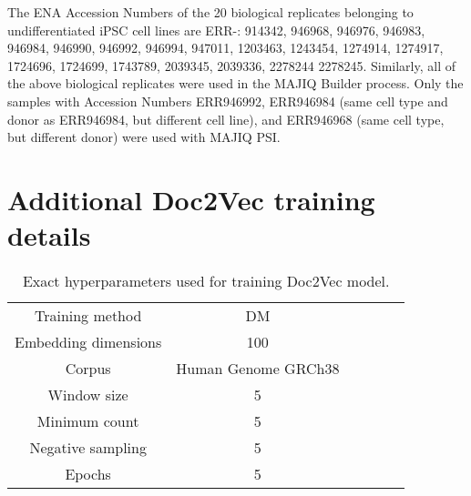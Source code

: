 The ENA Accession Numbers of the 20 biological replicates belonging to undifferentiated iPSC cell lines \cite{hipsci} are ERR-: 
914342, 946968, 946976, 946983, 946984, 946990, 946992, 946994, 947011, 1203463, 1243454, 1274914, 1274917, 1724696, 1724699, 1743789, 2039345, 2039336, 2278244 2278245.
Similarly, all of the above biological replicates were used in the MAJIQ Builder process. Only the samples with Accession Numbers ERR946992, ERR946984 (same cell type and donor as ERR946984, but different cell line), and ERR946968 (same cell type, but different donor) were used with MAJIQ PSI. 
%
%
%
%
%
%
%
%

%
%
%
%
%
%
%
%
%

\section{Additional Doc2Vec training details} \label{app:d2v}

\begin{table}[h!]
	\centering
	\begin{tabular}{ c c c  c c c} 
		\hline
		Training method & DM \\
		Embedding dimensions & 100 \\
		Corpus & Human Genome GRCh38 \\
		Window size & 5\\
		Minimum count & 5\\
		Negative sampling & 5\\
		Epochs & 5\\
		
		\hline
	\end{tabular}
	\caption{Exact hyperparameters used for training Doc2Vec model.
	}
	\label{table:d2vparams}
\end{table}

